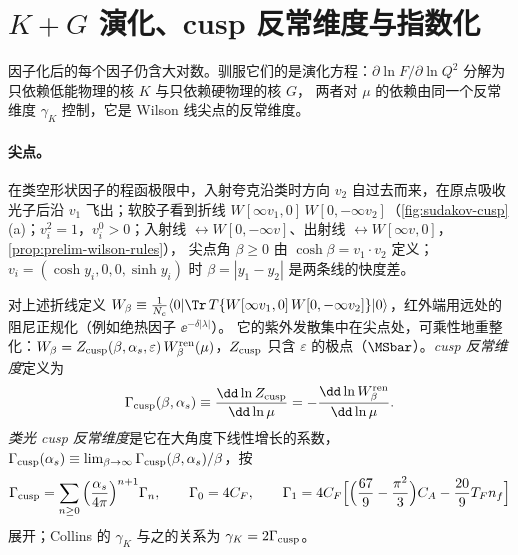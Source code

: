 \section{\texorpdfstring{$K+G$}{K+G} 演化、cusp 反常维度与指数化}\label{sec:sudakov-evolution}

因子化后的每个因子仍含大对数。驯服它们的是演化方程：$\partial\ln F/\partial\ln Q^2$ 分解为只依赖低能物理的核 $K$ 与只依赖硬物理的核 $G$，
两者对 $\mu$ 的依赖由同一个反常维度 $\gamma_K$ 控制，它是 Wilson 线尖点的反常维度。

\paragraph{尖点。}在类空形状因子的程函极限中，入射夸克沿类时方向 $v_2$ 自过去而来，在原点吸收光子后沿 $v_1$ 飞出；软胶子看到折线
$W[\infty v_1,0]\,W[0,-\infty v_2]$（\cref{fig:sudakov-cusp}(a)；$v_i^2=1$，$v_i^0>0$；入射线 $\leftrightarrow W[0,-\infty v]$、出射线 $\leftrightarrow W[\infty v,0]$，\cref{prop:prelim-wilson-rules}），
尖点角 $\beta\ge0$ 由 $\cosh\beta=v_1\cdot v_2$ 定义；$v_i=(\cosh y_i,0,0,\sinh y_i)$ 时 $\beta=|y_1-y_2|$ 是两条线的快度差。

\begin{definition}\label{def:sudakov-cusp}
对上述折线定义 $W_\beta\equiv\frac1{N_c}\langle0|\Tr\,T\{W[\infty v_1,0]\,W[0,-\infty v_2]\}|0\rangle$，红外端用远处的阻尼正规化（例如绝热因子 $\ee^{-\delta|\lambda|}$）。
它的紫外发散集中在尖点处，可乘性地重整化：$W_\beta=Z_{\rm cusp}(\beta,\alpha_s,\varepsilon)\,W_\beta^{\rm ren}(\mu)$，$Z_{\rm cusp}$ 只含 $\varepsilon$ 的极点（$\MSbar$）。\emph{cusp 反常维度}定义为
\begin{equation}\label{eq:sudakov-cusp-def}
\Gamma_{\rm cusp}(\beta,\alpha_s)\equiv\frac{\dd\ln Z_{\rm cusp}}{\dd\ln\mu}=-\frac{\dd\ln W_\beta^{\rm ren}}{\dd\ln\mu} .
\end{equation}
\emph{类光 cusp 反常维度}是它在大角度下线性增长的系数，$\Gamma_{\rm cusp}(\alpha_s)\equiv\lim_{\beta\to\infty}\Gamma_{\rm cusp}(\beta,\alpha_s)/\beta$，按
\begin{equation}\label{eq:sudakov-cusp-series}
\Gamma_{\rm cusp}=\sum_{n\ge0}\Big(\frac{\alpha_s}{4\pi}\Big)^{n+1}\Gamma_n,\qquad \Gamma_0=4C_F,\qquad
\Gamma_1=4C_F\Big[\Big(\frac{67}9-\frac{\pi^2}3\Big)C_A-\frac{20}9T_Fn_f\Big]
\end{equation}
展开；Collins 的 $\gamma_K$ 与之的关系为 $\gamma_K=2\Gamma_{\rm cusp}$。
\end{definition}

